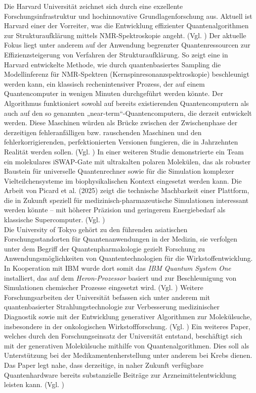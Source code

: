 Die Harvard Universität zeichnet sich durch eine exzellente Forschungsinfrastruktur und hochinnovative Grundlagenforschung aus. Aktuell ist Harvard einer der Vorreiter, was die Entwicklung effizienter Quantenalgorithmen zur Strukturaufklärung mittels NMR-Spektroskopie angeht. (Vgl. \cite{}) %
Der aktuelle Fokus liegt unter anderem auf der Anwendung begrenzter Quantenressourcen zur Effizienzsteigerung von Verfahren der Strukturaufklärung. So zeigt eine in Harvard entwickelte Methode, wie durch quantenbasiertes Sampling die Modellinferenz für NMR-Spektren (Kernspinresonanzspektroskopie) beschleunigt werden kann, ein klassisch rechenintensiver Prozess, der auf einem Quantencomputer in wenigen Minuten durchgeführt werden könnte. Der Algorithmus funktioniert sowohl auf bereits existierenden Quantencomputern als auch auf den so genannten „near-term“-Quantencomputern, die derzeit entwickelt werden. Diese Maschinen würden als Brücke zwischen der Zwischenphase der derzeitigen fehleranfälligen bzw. rauschenden Maschinen und den fehlerkorrigierenden, perfektionierten Versionen fungieren, die in Jahrzehnten Realität werden sollen. (Vgl. \cite{sels_quantum_2020})
In einer weiteren Studie demonstrierte ein Team ein molekulares iSWAP-Gate mit ultrakalten polaren Molekülen, das als robuster Baustein für universelle Quantenrechner sowie für die Simulation komplexer Vielteilchensysteme im biophysikalischen Kontext eingesetzt werden kann. Die Arbeit von Picard et al. (2025) zeigt die technische Machbarkeit einer Plattform, die in Zukunft speziell für medizinisch-pharmazeutische Simulationen interessant werden könnte – mit höherer Präzision und geringerem Energiebedarf als klassische Supercomputer. (Vgl. \cite{picard_entanglement_2025})\\

Die University of Tokyo gehört zu den führenden asiatischen Forschungsstandorten für Quantenanwendungen in der Medizin, sie verfolgen unter dem Begriff der Quantenpharmakologie gezielt Forschung zu Anwendungsmöglichkeiten von Quantentechnologien für die Wirkstoffentwicklung. In Kooperation mit IBM wurde dort somit das \textit{IBM Quantum System One} installiert, das auf dem \textit{Heron-Prozessor} basiert und zur Beschleunigung von Simulationen chemischer Prozesse eingesetzt wird. (Vgl. \cite{noauthor_utokyo_nodate}) Weitere Forschungsarbeiten der Universität befassen sich unter anderem mit quantenbasierter Strahlungstechnologie zur Verbesserung medizinischer Diagnostik sowie mit der Entwicklung generativer Algorithmen zur Molekülsuche, insbesondere in der onkologischen Wirkstoffforschung. (Vgl. \cite{shimazoe_development_2020})
Ein weiteres Paper, welches durch den Forschungseinsatz der Universität entstand, beschäftigt sich mit der generativen Molekülsuche mithilfe von Quantenalgorithmen. Dies soll als Unterstützung bei der Medikamentenherstellung unter anderem bei Krebs dienen. Das Paper legt nahe, dass derzeitige, in naher Zukunft verfügbare Quantenhardware bereits substanzielle Beiträge zur Arzneimittelentwicklung leisten kann. (Vgl. \cite{vakiliQuantumComputingEnhancedAlgorithm2024})

